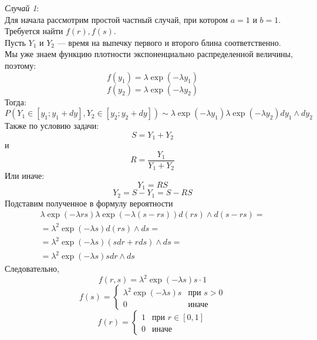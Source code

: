 \documentclass[12pt]{article} %
\theoremstyle{definition} %
\begin{document}
\textit{Случай 1}:\\
Для начала рассмотрим простой частный случай, при котором $a = 1$ и $b = 1$.\\
Требуется найти $f(r), f(s)$.\\
Пусть $Y_1$ и $Y_2$ — время на выпечку первого и второго блина соответственно.\\
Мы уже знаем функцию плотности экспоненциально распределенной величины, поэтому:
\[
    f(y_1) = \lambda \exp(- \lambda y_1)
\]
\[
    f(y_2) = \lambda \exp(- \lambda y_2)
\]
Тогда:
\[
    P(Y_1 \in [y_1; y_1 + dy], Y_2 \in [y_2; y_2 + dy]) \sim \lambda \exp(- \lambda y_1) \lambda \exp(- \lambda y_2) dy_1 \wedge dy_2
\]
Также по условию задачи:
\[
    S = Y_1 + Y_2
\]
и
\[
    R = \frac{Y_1}{Y_1 + Y_2}
\]
Или иначе:
\[
    Y_1 = R S
\]
\[
    Y_2 = S - Y_1 = S - R S
\]
Подставим полученное в формулу вероятности
\begin{eqnarray*}
    \lambda \exp(- \lambda r s) \lambda \exp(- \lambda (s - rs)) d(r s) \wedge d(s - r s) =\\
    = \lambda^2 \exp(- \lambda s) d(r s) \wedge ds =\\
    = \lambda^2 \exp(- \lambda s) (s dr + r ds) \wedge ds =\\
    = \lambda^2 \exp(- \lambda s) s dr \wedge ds
\end{eqnarray*}
Следовательно,
\[
    f(r, s) = \lambda^2 \exp(- \lambda s) s \cdot 1
\]
\[
    f(s) =
    \begin{cases}
        \lambda^2 \exp(- \lambda s) s &\text{при $s > 0$}\\
        0 &\text{иначе}
    \end{cases}
\]
\[
    f(r) =
    \begin{cases}
        1 &\text{при $r \in [0,1]$}\\
        0 &\text{иначе}
    \end{cases}
\]
\end{document}
